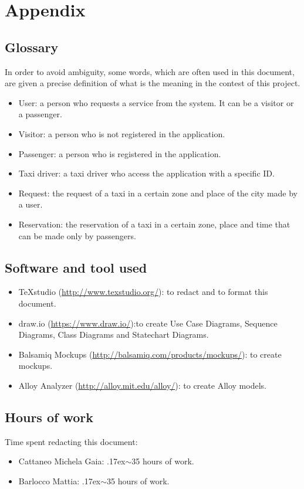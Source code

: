 \documentclass[18pt,oneside,a4paper, titlepage]{article}
\begin{document}
\section{Appendix}
	\subsection{Glossary}
		In order to avoid ambiguity, some words, which are often used in this document, are given a precise definition of what is the meaning in the contest of this project.
		\begin{itemize}
			\item User: a person who requests a service from the system. It can be a visitor or a passenger.
			\item Visitor: a person who is not registered in the application.
			\item Passenger: a person who is registered in the application.
			\item Taxi driver: a taxi driver who access the application with a specific ID.
			\item Request: the request of a taxi in a certain zone and place of the city made by a user.
			\item Reservation: the reservation of a taxi in a certain zone, place and time that can be made only by passengers.
	\end{itemize}
	\subsection{Software and tool used}
		\begin{itemize}
			\item TeXstudio (\url{http://www.texstudio.org/}): to redact and to format this document.
			\item draw.io (\url{https://www.draw.io/}):to create Use Case Diagrams, Sequence Diagrams, Class Diagrams and Statechart Diagrams.
			\item Balsamiq Mockups (\url{http://balsamiq.com/products/mockups/}): to create mockups.
			\item Alloy Analyzer (\url{http://alloy.mit.edu/alloy/}): to create Alloy models.
		\end{itemize}
	
	\subsection{Hours of work}
		Time spent redacting this document:
		\begin{itemize}
			\item Cattaneo Michela Gaia: {\raise.17ex\hbox{$\scriptstyle\sim$}}35 hours of work.
			\item Barlocco Mattia: {\raise.17ex\hbox{$\scriptstyle\sim$}}35 hours of work.
		\end{itemize}
\end{document}
